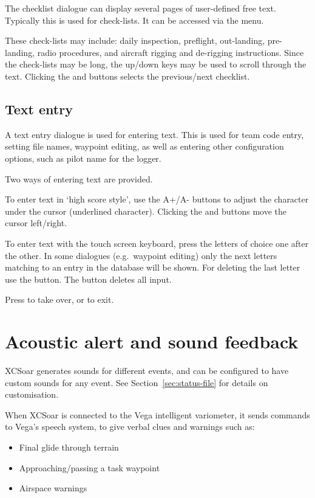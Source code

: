 The checklist dialogue can display several pages of user-defined free text.
Typically this is used for check-lists. It can be accessed via the menu.

\blink{}

These check-lists may include: daily inspection, preflight,
out-landing, pre-landing, radio procedures, and aircraft rigging and
de-rigging instructions.  Since the check-lists may be long, the
up/down keys may be used to scroll through the text. Clicking the
\bmenuw{$<$} and \bmenuw{$>$} buttons selects the previous/next
checklist.


\subsection*{Text entry} \label{sec:textentry}

A text entry dialogue is used for entering text.  This is used for team
code entry, setting file names, waypoint editing, as well as entering
other configuration options, such as pilot name for the logger.

Two ways of entering text are provided. 

To enter text in `high score style', use the A+/A- buttons to adjust the 
character under the cursor (underlined character). Clicking the \button{$<$} 
and \button{$>$} buttons move the cursor left/right.  

To enter text with the touch screen keyboard, press the letters of choice 
one after the other. In some dialogues (e.g.\ waypoint editing) only the next
letters matching to an entry in the database will be shown. For deleting the 
last letter use the \button{$<-$} button. The  button deletes all input.

Press  to take over, or  to exit. %


\section{Acoustic alert and sound feedback}

XCSoar generates sounds for different events, and can be configured to
have custom sounds for any event.  See Section~\ref{sec:status-file} for
details on customisation.

When XCSoar is connected to the Vega intelligent variometer, it sends
commands to Vega's speech system, to give verbal clues and warnings such as:
\begin{itemize}
\item Final glide through terrain
\item Approaching/passing a task waypoint
\item Airspace warnings
\end{itemize}

